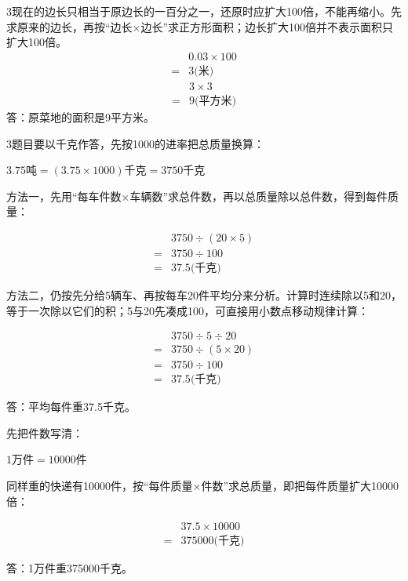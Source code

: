 \documentclass[multi=snippet,border={5bp 20bp 5bp 5bp}]{standalone}
\newenvironment{snippet}[3]{\begin{minipage}{#1bp}\color{answerred}\fontsize{#2}{#3}\selectfont\raggedright}{\end{minipage}}
\begin{document}
\begin{snippet}{505}{11.5}{14}\begin{multicols}{3}\raggedcolumns 现在的边长只相当于原边长的一百分之一，还原时应扩大100倍，不能再缩小。先求原来的边长，再按“边长×边长”求正方形面积；边长扩大100倍并不表示面积只扩大100倍。\[\begin{aligned}&0.03\times100\\={}&3\text{(米)}\end{aligned}\]\[\begin{aligned}&3\times3\\={}&9\text{(平方米)}\end{aligned}\]答：原菜地的面积是9平方米。\end{multicols}\end{snippet}
\begin{snippet}{505}{11.5}{14}\begin{multicols}{3}\raggedcolumns 题目要以千克作答，先按1000的进率把总质量换算：\par\noindent\(\displaystyle 3.75\text{吨}=(3.75\times1000)\text{千克}=3750\text{千克}\)\allowbreak \par 方法一，先用“每车件数×车辆数”求总件数，再以总质量除以总件数，得到每件质量：\par\noindent\[\displaystyle \begin{aligned}&3750\div(20\times5)\\={}&3750\div100\\={}&37.5\text{(千克)}\end{aligned}\]\par 方法二，仍按先分给5辆车、再按每车20件平均分来分析。计算时连续除以5和20，等于一次除以它们的积；5与20先凑成100，可直接用小数点移动规律计算：\par\noindent\[\displaystyle \begin{aligned}&3750\div5\div20\\={}&3750\div(5\times20)\\={}&3750\div100\\={}&37.5\text{(千克)}\end{aligned}\]\par 答：平均每件重37.5千克。\par 先把件数写清：\par\noindent\(\displaystyle 1\text{万件}=10000\text{件}\)\allowbreak \par 同样重的快递有10000件，按“每件质量×件数”求总质量，即把每件质量扩大10000倍：\par\noindent\[\displaystyle \begin{aligned}&37.5\times10000\\={}&375000\text{(千克)}\end{aligned}\]\par 答：1万件重375000千克。\end{multicols}\end{snippet}
\end{document}
